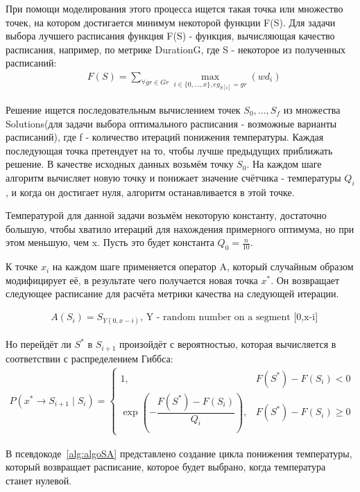 При помощи моделирования этого процесса ищется такая точка или множество точек, на котором достигается минимум некоторой функции F(S). Для задачи выбора лучшего расписания функция F(S) - функция, вычисляющая качество расписания, например, по метрике DurationG, где S - некоторое из полученных расписаний:
\begin{align}
	& {F(S)} =  \sum\limits_{\forall  gr \in Gr}\max\limits_{i \in \{0,...,x\}, eg_{S[i]} = gr}(wd_i)
\end{align}

Решение ищется последовательным вычислением точек {$S_0,...,S_f$ } из множества Solutions(для задачи выбора оптимального расписания - возможные варианты расписаний), где f - количество итераций понижения температуры. Каждая последующая точка претендует на то, чтобы лучше предыдущих приближать решение. В качестве исходных данных возьмём точку {$S_0$}. На каждом шаге алгоритм вычисляет новую точку и понижает значение счётчика - температуры {$Q_i$ }, и когда он достигает нуля, алгоритм останавливается в этой точке.

Температурой для данной задачи возьмём некоторую константу, достаточно большую, чтобы хватило итераций для нахождения примерного оптимума, но при этом меньшую, чем x. Пусть это будет константа {$Q_0 = \frac {n}{10}$}.

К точке {$x_i$} на каждом шаге применяется оператор A, который случайным образом модифицирует её, в результате чего получается новая точка {$x^*$}. Он возвращает следующее расписание для расчёта метрики качества на следующей итерации.

\begin{align}
	& A(S_i)= S_{Y(0, x-i)}\text{, Y - random number on a segment [0,x-i]}
\end{align}

Но перейдёт ли  {$S^*$} в  {$S_{i+1}$} произойдёт с вероятностью, которая вычисляется в соответствии с распределением Гиббса:
\begin{align}
	P(x^*\to{S_{i+1}}\mid{S_i})=
	\begin{cases}
		1, & F({S^*})-F({S_i})<0 \\
		\exp\left(-\dfrac{F(S^*)-F(S_i)}{Q_i}\right), & {F(S^*)-F(S_i)\geqslant 0}
	\end{cases}
\end{align}

В псевдокоде~\ref{alg:algoSA} представлено создание цикла понижения температуры, который возвращает расписание, которое будет выбрано, когда температура станет нулевой. 

